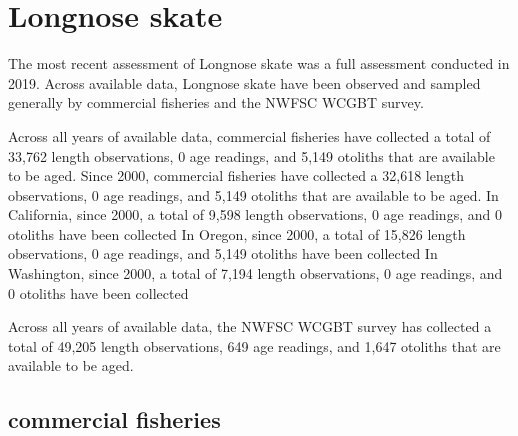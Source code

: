 \documentclass[11pt,
  english,
  letterpaper,
]{article}
\begin{document}

\hypertarget{longnose-skate}{%
\section{Longnose skate}\label{longnose-skate}}

\leavevmode\tagmcend\tagstructend


The most recent assessment of Longnose skate was a full assessment conducted in 2019. Across available data, Longnose skate have been observed and sampled generally by commercial fisheries and the NWFSC WCGBT survey.

\leavevmode\tagmcend\tagstructend\par


Across all years of available data, commercial fisheries have collected a total of 33,762 length observations, 0 age readings, and 5,149 otoliths that are available to be aged. Since 2000, commercial fisheries have collected a 32,618 length observations, 0 age readings, and 5,149 otoliths that are available to be aged. In California, since 2000, a total of 9,598 length observations, 0 age readings, and 0 otoliths have been collected In Oregon, since 2000, a total of 15,826 length observations, 0 age readings, and 5,149 otoliths have been collected In Washington, since 2000, a total of 7,194 length observations, 0 age readings, and 0 otoliths have been collected

\leavevmode\tagmcend\tagstructend\par


Across all years of available data, the NWFSC WCGBT survey has collected a total of 49,205 length observations, 649 age readings, and 1,647 otoliths that are available to be aged.

\leavevmode\tagmcend\tagstructend\par


\hypertarget{commercial-fisheries-29}{%
\subsection{commercial fisheries}\label{commercial-fisheries-29}}
\end{document}

